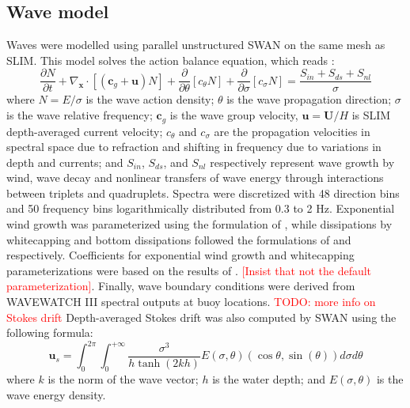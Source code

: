\documentclass[11pt,a4paper]{article}
\begin{document}
\subsection{Wave model}
Waves were modelled using parallel unstructured SWAN \citep{booij1999third} on the same mesh as SLIM. This model solves the action balance equation, which reads \citep{mei1989applied}:
\begin{equation}
    \dfrac{\partial N}{\partial t} + \nabla_\mathbf{x}\cdot[(\mathbf{c}_g+\mathbf{u})N] + \dfrac{\partial }{\partial \theta}[c_\theta N] + \dfrac{\partial}{\partial \sigma}[c_\sigma N] = \dfrac{S_{in}+S_{ds}+S_{nl}}{\sigma} \label{eq:swan}
\end{equation}
where $N=E/\sigma$ is the wave action density; $\theta$ is the wave propagation direction; $\sigma$ is the wave relative frequency; $\mathbf{c}_g$ is the wave group velocity, $\mathbf{u}=\mathbf{U}/H$ is SLIM depth-averaged current velocity; $c_\theta$ and $c_\sigma$ are the propagation velocities in spectral space due to refraction and shifting in frequency due to variations in depth and currents; and $S_{in}$, $S_{ds}$, and $S_{nl}$ respectively represent wave growth by wind, wave decay and nonlinear transfers of wave energy through interactions between triplets and quadruplets. Spectra were discretized with 48 direction bins and 50 frequency bins logarithmically distributed from 0.3 to 2 Hz. Exponential wind growth was parameterized using the formulation of \cite{janssen1991quasi}, while dissipations by whitecapping and bottom dissipations followed the formulations of \cite{komen1984existence} and \cite{madsen1989spectral} respectively. Coefficients for exponential wind growth and whitecapping parameterizations were based on the results of \cite{siadatmousavi2011evaluation}. \textcolor{red}{[Insist that not the default parameterization]}. Finally, wave boundary conditions were derived from WAVEWATCH III \citep{tolman2009user} spectral outputs at buoy locations. \textcolor{red}{TODO: more info on Stokes drift} Depth-averaged Stokes drift was also computed by SWAN using the following formula:
\begin{equation}
    \mathbf{u}_{s} = \int_0^{2\pi}\int_0^{+\infty} \dfrac{\sigma^3}{h\tanh(2kh)}E(\sigma,\theta)(\cos\theta, \sin(\theta))d\sigma d\theta
\end{equation}
where $k$ is the norm of the wave vector; $h$ is the water depth; and $E(\sigma,\theta)$ is the wave energy density.
\end{document}
